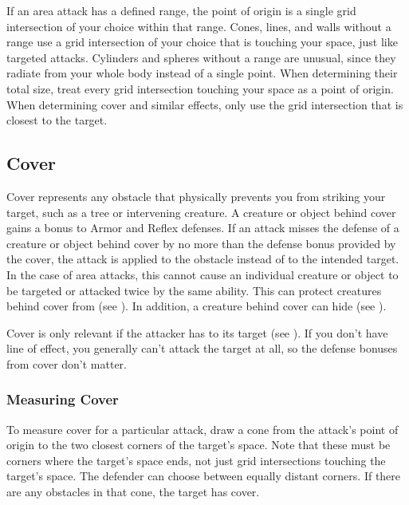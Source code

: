         If an area attack has a defined range, the point of origin is a single grid intersection of your choice within that range.
        Cones, lines, and walls without a range use a grid intersection of your choice that is touching your space, just like targeted attacks.
        Cylinders and spheres without a range are unusual, since they radiate from your whole body instead of a single point.
        When determining their total size, treat every grid intersection touching your space as a point of origin.
        When determining cover and similar effects, only use the grid intersection that is closest to the target.

    \subsection{Cover}\label{Cover}

        Cover represents any obstacle that physically prevents you from striking your target, such as a tree or intervening creature.
        A creature or object behind cover gains a  bonus to Armor and Reflex defenses.
        If an attack misses the defense of a creature or object behind cover by no more than the defense bonus provided by the cover,
            the attack is applied to the obstacle instead of to the intended target.
        In the case of area attacks, this cannot cause an individual creature or object to be targeted or attacked twice by the same ability.
        This can protect creatures behind cover from  (see ).
        In addition, a creature behind cover can hide (see ).

        Cover is only relevant if the attacker has  to its target (see ).
        If you don't have line of effect, you generally can't attack the target at all, so the defense bonuses from cover don't matter.

        \subsubsection{Measuring Cover}
            To measure cover for a particular attack, draw a cone from the attack's point of origin to the two closest corners of the target's space.
            Note that these must be corners where the target's space ends, not just grid intersections touching the target's space.
            The defender can choose between equally distant corners.
            If there are any obstacles in that cone, the target has cover.

